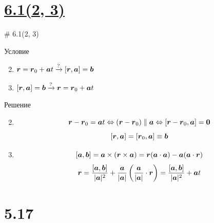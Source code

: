 \documentclass[russian]{beamer}
\begin{document}
  \section{\uline{6.1(2, 3)}}
  
  \begin{frame}{\# 6.1(2, 3)}
  
    \begin{block}{Условие}
      \begin{enumerate}
        \setcounter{enumi}{1}
        
        \item $\boldsymbol r = \boldsymbol r_0 + \boldsymbol a t \xrightarrow{\operatorname{?}} [\boldsymbol r, \boldsymbol a] = \boldsymbol b$
        
        \item $[\boldsymbol r, \boldsymbol a] = \boldsymbol b \xrightarrow{\operatorname{?}} \boldsymbol r = \boldsymbol r_0 + \boldsymbol a t$
      \end{enumerate}
    \end{block}
    
    \pause
    
    \begin{block}{Решение}
      \begin{enumerate}
        \setcounter{enumi}{1}
        
        \item
          \[\boldsymbol r - \boldsymbol r_0 = \boldsymbol a t
            \Leftrightarrow (\boldsymbol r - \boldsymbol r_0) \parallel \boldsymbol a
            \Leftrightarrow [\boldsymbol r - \boldsymbol r_0, \boldsymbol a] = \boldsymbol 0
          \]
          \[
            [\boldsymbol r, \boldsymbol a] = [\boldsymbol r_0, \boldsymbol a] \equiv \boldsymbol b
          \]
          
        \pause
        
        \item
          \[
            [\boldsymbol a, \boldsymbol b] = \boldsymbol a \times (\boldsymbol r \times \boldsymbol a) = \boldsymbol r (\boldsymbol a \cdot \boldsymbol a) - \boldsymbol a (\boldsymbol a \cdot \boldsymbol r)
          \]
          \[
            \boldsymbol r = \frac{[\boldsymbol a, \boldsymbol b]}{|\boldsymbol a|^2} + \frac{\boldsymbol a}{|\boldsymbol a|}\left(\frac{\boldsymbol a}{|\boldsymbol a|} \cdot \boldsymbol r\right)
            = \frac{[\boldsymbol a, \boldsymbol b]}{|\boldsymbol a|^2} + \boldsymbol a t
          \]
      \end{enumerate}
    \end{block}
  \end{frame}
    
    
  \section{5.17}
  
\end{document}
